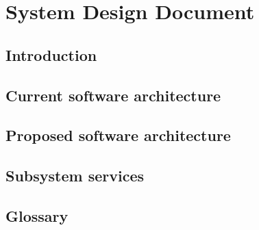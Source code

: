 


	\part*{System Design Document}

	
	\newpage

	\tableofcontents* %
	\newpage

	\chapter{Introduction}
	
	\newpage

	\chapter{Current software architecture}
	

	\chapter{Proposed software architecture}
	

	\chapter{Subsystem services}
	

	\chapter{Glossary}
	

